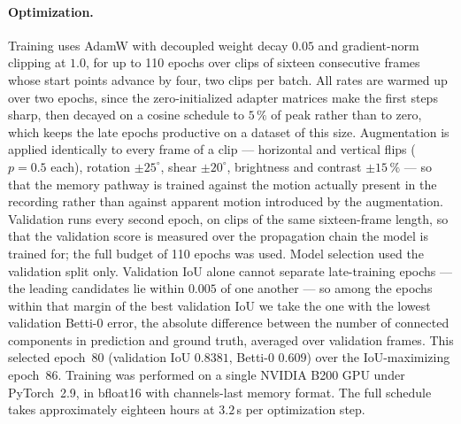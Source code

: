 \documentclass[11pt,a4paper]{article}
\makeatletter
\let\SD@subsection\subsection
\renewcommand\subsection{\FloatBarrier\@ifstar{\SD@subsection*}{\SD@subsection}}
\makeatother
\begin{document}
\paragraph{Optimization.}
Training uses AdamW \cite{loshchilov2019adamw} with decoupled weight decay
$0.05$ and gradient-norm clipping at $1.0$, for up to 110 epochs over clips
of sixteen consecutive frames whose start points advance by four, two clips
per batch. All rates are warmed up over two epochs, since the
zero-initialized adapter matrices make the first steps sharp, then decayed
on a cosine schedule to $5\,\%$ of peak rather than to zero, which keeps the
late epochs productive on a dataset of this size. Augmentation is applied
identically to every frame of a clip --- horizontal and vertical flips
($p = 0.5$ each), rotation $\pm25^{\circ}$, shear $\pm20^{\circ}$,
brightness and contrast $\pm15\,\%$ --- so that the memory pathway is
trained against the motion actually present in the recording rather than
against apparent motion introduced by the augmentation. Validation runs
every second epoch, on clips of the same sixteen-frame length, so that the
validation score is measured over the propagation chain the model is trained
for; the full budget of 110 epochs was used. Model selection used the
validation split only. Validation IoU alone cannot separate late-training
epochs --- the leading candidates lie within $0.005$ of one another --- so
among the epochs within that margin of the best validation IoU we take the one
with the lowest validation Betti-0 error, the absolute difference between the
number of connected components in prediction and ground truth, averaged over
validation frames. This selected epoch~80 (validation IoU $0.8381$, Betti-0 $0.609$) over the
IoU-maximizing epoch~86. Training was performed on a single NVIDIA
B200 GPU under PyTorch~2.9, in bfloat16 with channels-last memory format. The full schedule takes approximately eighteen hours at $3.2$\,s
per optimization step.


\subsection{Evaluation metrics}
\label{sec:met:metrics}
\end{document}
